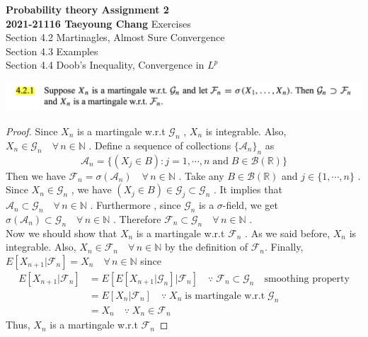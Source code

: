 \documentclass[12pt, A4]{article}
\newcommand{\N}{\mathbb{N}}
\newcommand{\R}{\mathbb{R}}
\newcommand{\A}{\mathcal{A}}
\newcommand{\B}{\mathcal{B}}
\newcommand{\G}{\mathcal{G}}
\newcommand{\F}{\mathcal{F}}
\newcommand{\foranyn}{\quad \forall \, n\in \N}
\begin{document}
\begin{titlepage}
	\begin{center}
		\vspace*{5cm}
		\textbf{\Large Probability theory \MakeUppercase{} Assignment 2}
		\\
		\vspace{1.5cm}
		\textbf{2021-21116 Taeyoung Chang}
		\vfill
		Exercises \\ Section 4.2 Martinagles, Almost Sure Convergence \\ Section 4.3 Examples \\ Section 4.4 Doob's Inequality, Convergence in $L^p$ 
	
		\vspace*{3cm}
		\thispagestyle{empty}
	\end{center}
\end{titlepage}

\includegraphics[width=17cm]{Exer4.2.1.png}

\begin{proof}
    Since $X_n$ is a martingale w.r.t $\G_n$ , $X_n$ is integrable. Also, $X_n\in \G_n\foranyn$ . Define a sequence of collections $\{\A_n\}_n$ as
    $$
        \A_n=\{(X_j\in B) : j=1, \cdots, n \; \text{and}\; B\in \B(\R)\}
    $$
    Then we have $\F_n=\sigma(\A_n)\foranyn$ . Take any $B\in \B(\R)$ and $j\in \{1, \cdots, n\}$ . Since $X_n\in \G_n$ , we have $(X_j\in B)\in \G_j\subset \G_n$ . It implies that $\A_n\subset \G_n\foranyn$ . Furthermore , since $\G_n$ is a $\sigma$-field, we get $\sigma(\A_n)\subset \G_n\foranyn$ . Therefore $\F_n\subset \G_n \foranyn$ . \\  
    Now we should show that $X_n$ is a martingale w.r.t $\F_n$ . As we said before, $X_n$ is integrable. Also, $X_n\in \F_n\foranyn$ by the definition of $\F_n$. Finally, $E[X_{n+1}|\F_n]=X_n \foranyn$ since
    \begin{align*}
        E[X_{n+1}|\F_n] &= E[E[X_{n+1}|\G_n]\big|\F_n] \quad \because \;\F_n\subset \G_n \quad \text{smoothing property} \\
        &= E[X_n|\F_n] \quad \because \; X_n\; \text{is martingale w.r.t} \; \G_n \\
        &= X_n \quad \because \; X_n\in \F_n
    \end{align*}
    Thus, $X_n$ is a martingale w.r.t $\F_n$
\end{proof}
\end{document}
